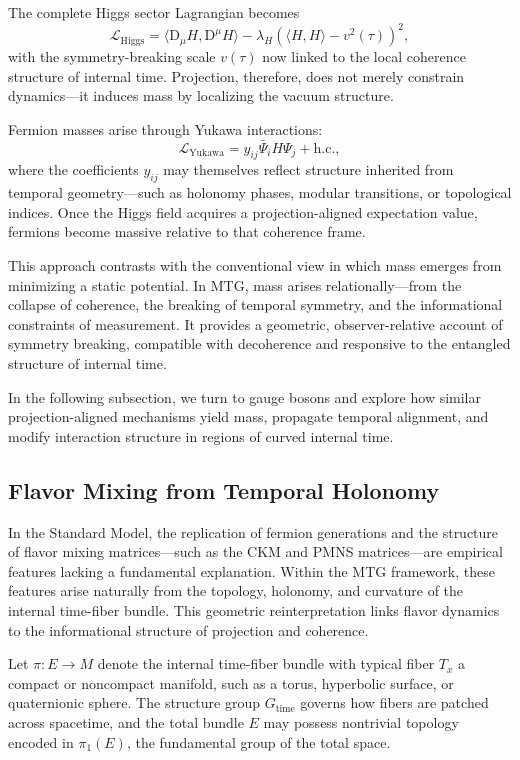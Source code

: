 \documentclass[11pt]{article}
\begin{document}
The complete Higgs sector Lagrangian becomes
\begin{equation}
\mathcal{L}_{\mathrm{Higgs}} = \langle \mathrm{D}_\mu H, \mathrm{D}^\mu H \rangle - \lambda_H \left( \langle H, H \rangle - v^2(\tau) \right)^2,
\end{equation}
with the symmetry-breaking scale \( v(\tau) \) now linked to the local coherence structure of internal time. Projection, therefore, does not merely constrain dynamics—it induces mass by localizing the vacuum structure.

Fermion masses arise through Yukawa interactions:
\begin{equation}
\mathcal{L}_{\mathrm{Yukawa}} = y_{ij} \bar{\Psi}_i H \Psi_j + \text{h.c.},
\end{equation}
where the coefficients \( y_{ij} \) may themselves reflect structure inherited from temporal geometry—such as holonomy phases, modular transitions, or topological indices. Once the Higgs field acquires a projection-aligned expectation value, fermions become massive relative to that coherence frame.

This approach contrasts with the conventional view in which mass emerges from minimizing a static potential. In MTG, mass arises relationally—from the collapse of coherence, the breaking of temporal symmetry, and the informational constraints of measurement. It provides a geometric, observer-relative account of symmetry breaking, compatible with decoherence and responsive to the entangled structure of internal time.

In the following subsection, we turn to gauge bosons and explore how similar projection-aligned mechanisms yield mass, propagate temporal alignment, and modify interaction structure in regions of curved internal time.
\subsection{Flavor Mixing from Temporal Holonomy}
In the Standard Model, the replication of fermion generations and the structure of flavor mixing matrices—such as the CKM and PMNS matrices—are empirical features lacking a fundamental explanation. Within the MTG framework, these features arise naturally from the topology, holonomy, and curvature of the internal time-fiber bundle. This geometric reinterpretation links flavor dynamics to the informational structure of projection and coherence.

Let \( \pi: E \to M \) denote the internal time-fiber bundle with typical fiber \( T_x \) a compact or noncompact manifold, such as a torus, hyperbolic surface, or quaternionic sphere. The structure group \( G_{\mathrm{time}} \) governs how fibers are patched across spacetime, and the total bundle \( E \) may possess nontrivial topology encoded in \( \pi_1(E) \), the fundamental group of the total space.
\end{document}
